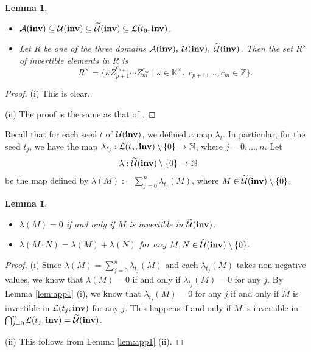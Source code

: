 \documentclass{amsart}
\newtheorem{lemma}[theorem]{Lemma}
\theoremstyle{definition}
\theoremstyle{remark}
\numberwithin{equation}{section}
\newcommand{\fan}[1]{\textcolor{blue}{#1}}
\begin{document}
\begin{lemma} \label{lem:app2}
\begin{itemize}
    \item [(i)] $\mathcal A({\bf inv})\subseteq \mathcal U({\bf inv})\subseteq \widetilde {\mathcal U}({\bf inv})\subseteq \mathcal L(t_0,{\bf inv})$.
    \item[(ii)] Let $R$ be one of the three domains
$\mathcal A({\bf inv}),\; \mathcal U({\bf inv}),\;\widetilde {\mathcal U}({\bf inv})$. Then the set $R^\times$ of invertible elements in $R$ is 
    $$R^\times =\{\kappa Z_{p+1}^{c_{p+1}}\cdots Z_m^{c_m}\mid \kappa\in\mathbb K^\times,\; c_{p+1},\ldots,c_m\in \mathbb Z\}.$$
\end{itemize}
\end{lemma}
\begin{proof}
    (i) This is clear. 
    
    (ii) The proof is the same as that of \cite[Theorem 2.2]{GLS13}.
\end{proof}

Recall that for each seed $t$ of $\mathcal U({\bf inv})$, we defined a map $\lambda_t$. In particular, 
 for the seed $t_j$, we have the map $\lambda_{t_j}:\mathcal L(t_j,{\bf inv})\setminus\{0\}\rightarrow \mathbb N$, where $j=0,\ldots,n$. Let 
 \begin{eqnarray}\label{eqn:lambda}
    \lambda:\widetilde {\mathcal U}({\bf inv})\setminus\{0\} \rightarrow \mathbb N \nonumber
 \end{eqnarray}
 be the map defined by $\lambda(M):=\sum_{j=0}^n\lambda_{t_j}(M)$, where $M\in \widetilde {\mathcal U}({\bf inv})\setminus\{0\}$.

 

 \begin{lemma}\label{lem:app3}
     \begin{itemize}
         \item [(i)] $\lambda(M)=0$ if and only if $M$ is invertible in  $\widetilde {\mathcal U}({\bf inv})$.
         \item [(ii)]  $\lambda(M\cdot N)=\lambda(M)+\lambda(N)$ for any  $M,N\in\widetilde {\mathcal U}({\bf inv})\setminus\{0\}$.
     \end{itemize}
 \end{lemma}
\begin{proof}
(i) Since $\lambda(M)=\sum_{j=0}^n \lambda_{t_j}(M)$ and each $\lambda_{t_j}(M)$ takes non-negative values, we know that $\lambda(M)=0$ if and only if $\lambda_{t_j}(M)=0$ for any $j$. By Lemma \ref{lem:app1} (i), we know that $\lambda_{t_j}(M)=0$ for any $j$ if and only if $M$ is invertible in $\mathcal L(t_j,{\bf inv})$ for any $j$. This happens if and only if $M$ is invertible in $\bigcap_{j=0}^n\mathcal L(t_j,{\bf inv})=\widetilde {\mathcal U}({\bf inv})$.

(ii) This follows from Lemma \ref{lem:app1} (ii).
\end{proof}
\end{document}
